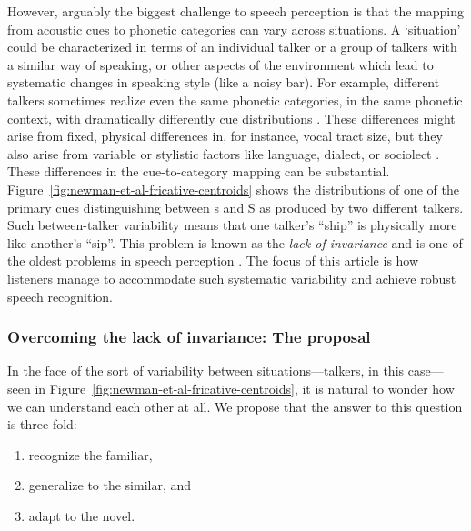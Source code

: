 \label{r3-environment-situation}
However, arguably the biggest challenge to speech perception is that the mapping from acoustic cues to phonetic categories can vary across situations. A `situation' could be characterized in terms of an individual talker or a group of talkers with a similar way of speaking, or other aspects of the environment which lead to systematic changes in speaking style (like a noisy bar). For example, different talkers sometimes realize even the same phonetic categories, in the same phonetic context, with dramatically differently cue distributions \autocite[e.g.,][]{Allen2003,McMurray2011a,Newman2001}.  These differences might arise from fixed, physical differences in, for instance, vocal tract size, but they also arise from variable or stylistic factors like language, dialect, or sociolect \autocite[e.g.,][]{Babel2014,Johnson2006,Labov1972,Pierrehumbert2003}.  These differences in the cue-to-category mapping can be substantial.
Figure~\ref{fig:newman-et-al-fricative-centroids} shows the distributions of one of the primary cues distinguishing between \ph s and \ph S as produced by two different talkers.  Such between-talker variability means that one talker's ``ship'' is physically more like another's ``sip''.
This problem is known as the \emph{lack of invariance} and is one of the oldest problems in speech perception \autocite{Liberman1967}.
The focus of this article is how listeners manage to accommodate such systematic variability and achieve robust speech recognition.

\subsubsection{Overcoming the lack of invariance: The proposal}
\label{sec:overc-lack-invar}

In the face of the sort of variability between situations---talkers, in this case---seen in Figure~\ref{fig:newman-et-al-fricative-centroids}, it is natural to wonder how we can understand each other at all.  We propose that the answer to this question is three-fold:

\begin{enumerate}
\item recognize the familiar,
\item generalize to the similar, and
\item adapt to the novel.
\end{enumerate}

